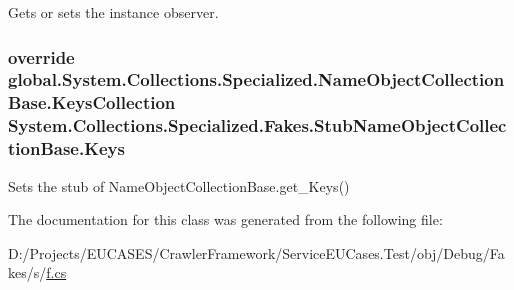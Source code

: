 Gets or sets the instance observer.

\hypertarget{class_system_1_1_collections_1_1_specialized_1_1_fakes_1_1_stub_name_object_collection_base_aa64496688748f23d40a1669d306fb9da}{
\subsubsection[{Keys}]{\setlength{\rightskip}{0pt plus 5cm}override global.\-System.\-Collections.\-Specialized.\-Name\-Object\-Collection\-Base.\-Keys\-Collection System.\-Collections.\-Specialized.\-Fakes.\-Stub\-Name\-Object\-Collection\-Base.\-Keys\hspace{0.3cm}{\ttfamily [get]}}}\label{class_system_1_1_collections_1_1_specialized_1_1_fakes_1_1_stub_name_object_collection_base_aa64496688748f23d40a1669d306fb9da}


Sets the stub of Name\-Object\-Collection\-Base.\-get\-\_\-\-Keys()



The documentation for this class was generated from the following file\-:\begin{DoxyCompactItemize}
\item 
D\-:/\-Projects/\-E\-U\-C\-A\-S\-E\-S/\-Crawler\-Framework/\-Service\-E\-U\-Cases.\-Test/obj/\-Debug/\-Fakes/s/\hyperlink{s_2f_8cs}{f.\-cs}\end{DoxyCompactItemize}
